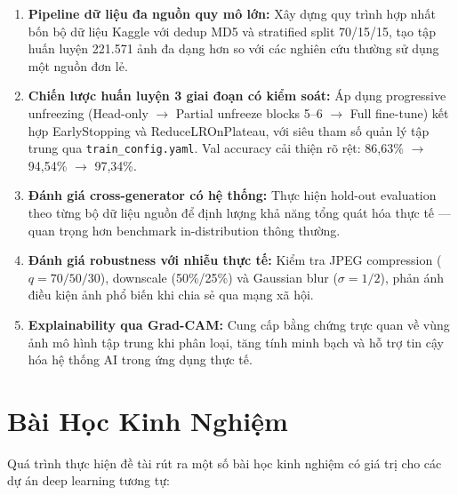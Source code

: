 \begin{enumerate}
  \item \textbf{Pipeline dữ liệu đa nguồn quy mô lớn:} Xây dựng quy trình hợp nhất bốn bộ dữ liệu Kaggle với dedup MD5 và stratified split 70/15/15, tạo tập huấn luyện 221.571 ảnh đa dạng hơn so với các nghiên cứu thường sử dụng một nguồn đơn lẻ.

  \item \textbf{Chiến lược huấn luyện 3 giai đoạn có kiểm soát:} Áp dụng progressive unfreezing (Head-only $\to$ Partial unfreeze blocks 5--6 $\to$ Full fine-tune) kết hợp EarlyStopping và ReduceLROnPlateau, với siêu tham số quản lý tập trung qua \texttt{train\_config.yaml}. Val accuracy cải thiện rõ rệt: 86,63\% $\to$ 94,54\% $\to$ 97,34\%.

  \item \textbf{Đánh giá cross-generator có hệ thống:} Thực hiện hold-out evaluation theo từng bộ dữ liệu nguồn để định lượng khả năng tổng quát hóa thực tế --- quan trọng hơn benchmark in-distribution thông thường.

  \item \textbf{Đánh giá robustness với nhiễu thực tế:} Kiểm tra JPEG compression ($q = 70/50/30$), downscale (50\%/25\%) và Gaussian blur ($\sigma = 1/2$), phản ánh điều kiện ảnh phổ biến khi chia sẻ qua mạng xã hội.

  \item \textbf{Explainability qua Grad-CAM:} Cung cấp bằng chứng trực quan về vùng ảnh mô hình tập trung khi phân loại, tăng tính minh bạch và hỗ trợ tin cậy hóa hệ thống AI trong ứng dụng thực tế.
\end{enumerate}

\section{Bài Học Kinh Nghiệm}

Quá trình thực hiện đề tài rút ra một số bài học kinh nghiệm có giá trị cho các dự án deep learning tương tự:

